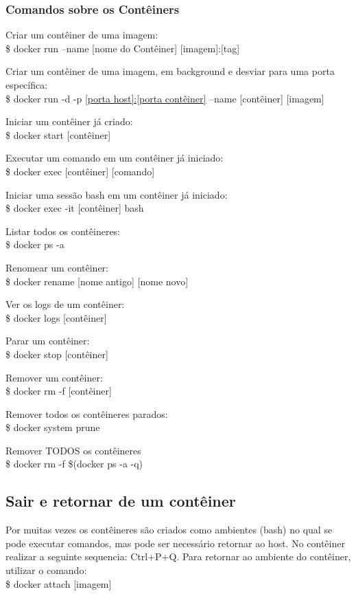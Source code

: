 \documentclass[a4paper,11pt]{article}
\begin{document}
\subsubsection{Comandos sobre os Contêiners}
Criar um contêiner de uma imagem: \\
{\ttfamily\$ docker run --name [nome do Contêiner] [imagem]:[tag]}

Criar um contêiner de uma imagem, em background e desviar para uma porta específica: \\
{\ttfamily\$ docker run -d -p \url{[porta host]:[porta contêiner]} --name 
[contêiner] [imagem]}

Iniciar um contêiner já criado: \\
{\ttfamily\$ docker start [contêiner]}

Executar um comando em um contêiner já iniciado: \\
{\ttfamily\$ docker exec [contêiner] [comando]}

Iniciar uma sessão bash em um contêiner já iniciado: \\
{\ttfamily\$ docker exec -it [contêiner] bash}

Listar todos os contêineres: \\
{\ttfamily\$ docker ps -a}

Renomear um contêiner: \\
{\ttfamily\$ docker rename [nome antigo] [nome novo]}

Ver os logs de um contêiner: \\
{\ttfamily\$ docker logs [contêiner]}

Parar um contêiner: \\
{\ttfamily\$ docker stop [contêiner]}

Remover um contêiner: \\
{\ttfamily\$ docker rm -f [contêiner]}

Remover todos os contêineres parados: \\
{\ttfamily\$ docker system prune}

Remover TODOS os contêineres \\
{\ttfamily\$ docker rm -f \$(docker ps -a -q)}

\subsection{Sair e retornar de um contêiner}
Por muitas vezes os contêineres são criados como ambientes (bash) no qual se pode executar comandos, mas pode ser necessário retornar ao host. No contêiner realizar a seguinte sequencia: {\ttfamily Ctrl+P+Q}. Para retornar ao ambiente do contêiner, utilizar o comando: \\
{\ttfamily\$ docker attach [imagem]}
\end{document}
